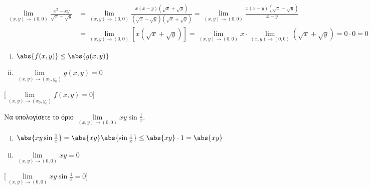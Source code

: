 \documentclass[a4paper,11pt]{report}
\begin{document}
  \begin{example}
    \begin{align*}
      \lim\limits_{(x,y)\to (0, 0)} \frac{x^{2}-xy}{\sqrt{x} - \sqrt{y}} 
    &= \lim\limits_{(x,y)\to (0, 0)} \frac{x(x-y)(\sqrt{x} + \sqrt{y})}{(\sqrt{x} -
    \sqrt{y} )(\sqrt{x} + \sqrt{y})} = \lim\limits_{(x,y)\to (0, 0)}
    \frac{x(x-y)(\sqrt{x} - \sqrt{y} )}{x-y} \\
    &= \lim\limits_{(x,y)\to (0,0)} [x(\sqrt{x} + \sqrt{y})] = \lim\limits_{(x,y)\to
    (0, 0)} x \cdot \lim\limits_{(x,y)\to (0, 0)} (\sqrt{x} + \sqrt{y}) = 0 \cdot 0 = 0 
    \end{align*}
  \end{example}



  \begin{mybox2}
    \begin{thmbreak}
      \label{thm:prop2}
      \begin{minipage}{0.25\textwidth}
        \begin{enumerate}[i)]
          \item $ \abs{f(x,y)} \leq \abs{g(x,y)} $ \hfill {}
          \item $ \lim\limits_{(x,y)\to (x_{0}, y_{0})} g(x,y) = 0 $ \hfill {}
        \end{enumerate}
      \end{minipage}

      [$ \lim\limits_{(x,y)\to (x_{0}, y_{0})} f(x,y) = 0 $]
    \end{thmbreak}
  \end{mybox2}


  \begin{example}
    Να υπολογίσετε το όριο $ \lim\limits_{(x,y)\to (0, 0)} xy \sin{\frac{1}{x}} $. 

    \begin{solution}
    \item {}
      \begin{minipage}{0.38\textwidth}
        \begin{enumerate}[i)]
          \item $ \abs{xy \sin{\frac{1}{x}}} = \abs{xy} 
            \abs{\sin{\frac{1}{x}}} \leq \abs{xy} \cdot 1 = \abs{xy} $ 
            \hfill {}
          \item $ \lim\limits_{(x,y)\to (0, 0)} xy = 0$ \hfill {}
        \end{enumerate}
      \end{minipage}

      [$ \lim\limits_{(x,y)\to (0, 0)} xy 
      \sin{\frac{1}{x}} = 0$]
    \end{solution}
  \end{example}
\end{document}
